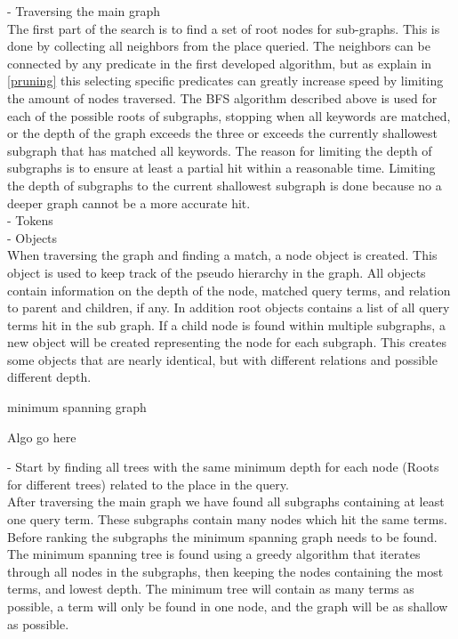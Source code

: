 - Traversing the main graph\\
The first part of the search is to find a set of root nodes for sub-graphs. This is done by collecting all neighbors from the place queried. The neighbors can be connected by any predicate in the first developed algorithm, but as explain in \ref{pruning} this selecting specific predicates can greatly increase speed by limiting the amount of nodes traversed. The BFS algorithm described above is used for each of the possible roots of subgraphs, stopping when all keywords are matched, or the depth of the graph exceeds the three or exceeds the currently shallowest subgraph that has matched all keywords. The reason for limiting the depth of subgraphs is to ensure at least a partial hit within a reasonable time. Limiting the depth of subgraphs to the current shallowest subgraph is done because no a deeper graph cannot be a more accurate hit.\\
- Tokens\\
- Objects\\
When traversing the graph and finding a match, a node object is created. This object is used to keep track of the pseudo hierarchy in the graph. All objects contain information on the depth of the node, matched query terms, and relation to parent and children, if any. In addition root objects contains a list of all query terms hit in the sub graph. If a child node is found within multiple subgraphs, a new object will be created representing the node for each subgraph. This creates some objects that are nearly identical, but with different relations and possible different depth.\\

\begin{algorithm}
\caption{minimum spanning graph}
\begin{algorithmic}[1]
Algo go here
\EndProcedure
\end{algorithmic}
\end{algorithm}

- Start by finding all trees with the same  minimum depth for each node (Roots for different trees) related to the place in the query.\\
After traversing the main graph we have found all subgraphs containing at least one query term. These subgraphs contain many nodes which hit the same terms. Before ranking the subgraphs the minimum spanning graph needs to be found. The minimum spanning tree is found using a greedy algorithm that iterates through all nodes in the subgraphs, then keeping the nodes containing the most terms, and lowest depth. The minimum tree will contain as many terms as possible, a term will only be found in one node, and the graph will be as shallow as possible.\\

